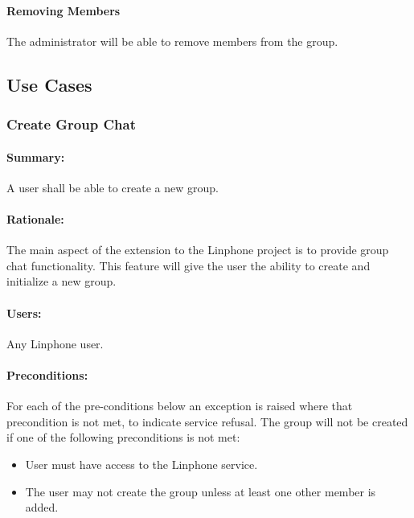 \documentclass[11pt]{article}
\begin{document}
\paragraph{Removing Members} The administrator will be able to remove  members from the group.

\subsection{Use Cases}
\subsubsection{Create Group Chat} \label{UC-create-group}
\paragraph{Summary:} A user shall be able to create a new group.
\paragraph{Rationale:} The main aspect of the extension to the Linphone project is to provide group chat functionality. This feature will give the user the ability to create and initialize a new group.
\paragraph{Users:}  Any Linphone user.
\paragraph{Preconditions:}For each of the pre-conditions below an exception is raised where that precondition is not met, to indicate service refusal.
The group will not be created if one of the following preconditions is not met:
\begin{itemize}
\item	User must have access to the Linphone service.
\item	The user may not create the group unless at least one other member is added.
\end{itemize}
\end{document}

